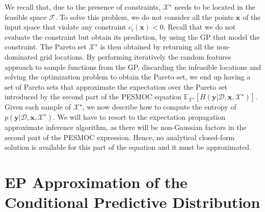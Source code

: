 We recall that, due to the presence of constraints,  $\mathcal{X}^\star$ needs to be located in
the feasible space $\mathcal{F}$. To solve this problem, we do not consider all the points $\mathbf{x}$ of the input space that violate any constraint $c_i(\mathbf{x}) < 0$. Recall that we do not evaluate the constraint but obtain its prediction, by using the GP that model the constraint. The Pareto set $\mathcal{X}^\star$ is then obtained by returning all
the non-dominated grid locations. By performing iteratively the random features approach to sample functions from the GP, discarding the infeasible locations and solving the optimization problem to obtain the Pareto set, we end up having a set of Pareto sets that approximate the expectation over the Pareto set introduced by the second part of the PESMOC equation $\mathbb{E}_{\mathcal{X}^{\star}} [H(\textbf{y}|\mathcal{D},\textbf{x},\mathcal{X}^{\star})]$. Given each sample of $\mathcal{X}^\star$, we now describe how to compute the entropy
of $p(\mathbf{y}|\mathcal{D}, \mathbf{x},\mathcal{X}^\star)$. We will have to resort to the expectation propagation approximate inference algorithm, as there will be non-Gaussian factors in the second part of the PESMOC expression. Hence, no analytical closed-form solution is available for this part of the equation and it must be approximated.

\section{EP Approximation of the Conditional Predictive Distribution}

